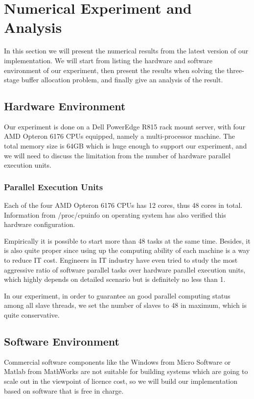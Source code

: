 \documentclass[12pt,a4paper]{report}
\begin{document}
\section{Numerical Experiment and Analysis}

In this section we will present the numerical results from the latest version of our implementation. We will start from listing the hardware and software environment of our experiment, then present the results when solving the three-stage buffer allocation problem, and finally give an analysis of the result.

\subsection{Hardware Environment}

Our experiment is done on a Dell PowerEdge R815 rack mount server, with four AMD Opteron 6176 CPUs equipped, namely a multi-processor machine. The total memory size is 64GB which is huge enough to support our experiment, and we will need to discuss the limitation from the number of hardware parallel execution units.

\subsubsection{Parallel Execution Units}

Each of the four AMD Opteron 6176 CPUs has 12 cores, thus 48 cores in total. Information from /proc/cpuinfo on operating system has also verified this hardware configuration.

Empirically it is possible to start more than 48 tasks at the same time. Besides, it is also quite proper since using up the computing ability of each machine is a way to reduce IT cost. Engineers in IT industry have even tried to study the most aggressive ratio of software parallel tasks over hardware parallel execution units, which highly depends on detailed scenario but is definitely no less than 1.

In our experiment, in order to guarantee an good parallel computing status among all slave threads, we set the number of slaves to 48 in maximum, which is quite conservative.

\subsection{Software Environment}

Commercial software components like the Windows from Micro Software or Matlab from MathWorks are not suitable for building systems which are going to scale out in the viewpoint of licence cost, so we will build our implementation based on software that is free in charge.
\end{document}
